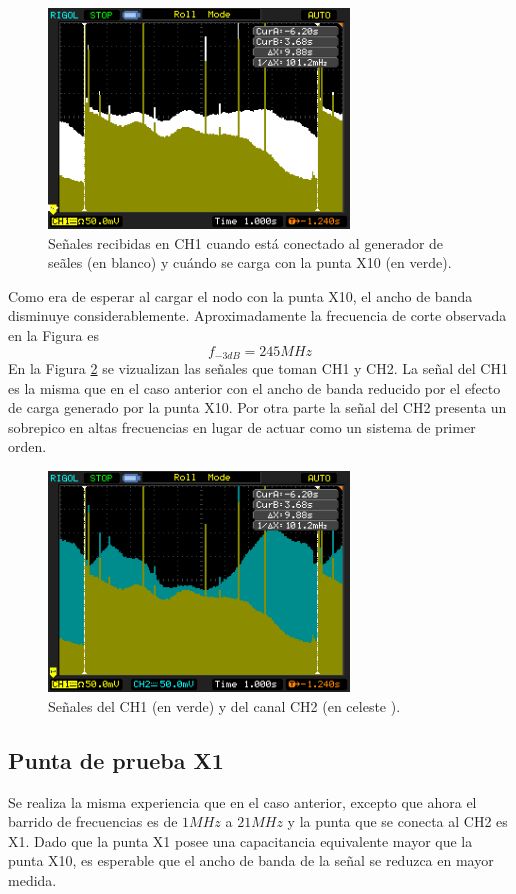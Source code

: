 \documentclass[a4paper,10pt]{article}
\begin{document}
		\begin{figure}[!htb]
			\centering
			\includegraphics[width=8cm]
			{Imagenes/Mediciones instrumentos/NewFile1.png}
			\caption{Se\~nales recibidas en CH1 cuando est\'a conectado al 
			generador de se\~ales (en blanco) y cu\'ando se carga con la punta
			X10 (en verde).} \label{img001}
		\end{figure}
			
		\indent Como era de esperar al cargar el nodo con la punta X10, el 
		ancho de banda disminuye considerablemente. Aproximadamente la 
		frecuencia de corte observada en la Figura es $$f_{-3dB}=245MHz$$
		\indent En la Figura \ref{img000} se vizualizan las se\~nales que 
		toman CH1 y CH2. La se\~nal del CH1 es la misma que en el caso 
		anterior con el ancho de banda reducido por el efecto de carga 
		generado por la punta X10. Por otra parte la se\~nal del CH2 presenta
		un sobrepico en altas frecuencias en lugar de actuar como un sistema 
		de primer orden.
		
		\begin{figure}[!htb]
			\centering
			\includegraphics[width=8cm]
			{Imagenes/Mediciones instrumentos/NewFile0.png}
			\caption{Se\~nales del CH1 (en verde) y del canal CH2 (en celeste
			).} \label{img000}
		\end{figure}
									
		\subsection{Punta de prueba X1}
		\indent Se realiza la misma experiencia que en el caso anterior, 
		excepto que ahora el barrido de frecuencias es de $1MHz$ a $21MHz$ y 
		la punta que se conecta al CH2 es X1. Dado que la punta X1 posee una 
		capacitancia equivalente mayor que la punta X10, es esperable que el 
		ancho de banda de la se\~nal se reduzca en mayor medida. \\
\end{document}
